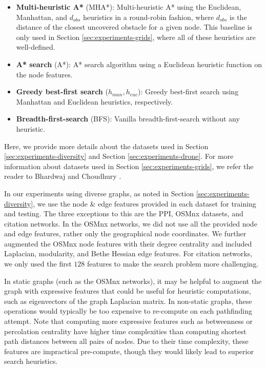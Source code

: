 \begin{itemize}
    \item \textbf{Multi-heuristic A*} (MHA*)\cite{aine2016multi}: Multi-heuristic A* using the Euclidean, Manhattan, and $d_{obs}$ heuristics in a round-robin fashion, where $d_{obs}$ is the distance of the closest uncovered obstacle for a given node.  This baseline is only used in Section \ref{sec:experiments-grids}, where all of these heuristics are well-defined.
    
    \item \textbf{A* search} (A*): A* search algorithm using a Euclidean heuristic function on the node features.
    
    \item \textbf{Greedy best-first search} ($h_{man}, h_{euc}$): Greedy best-first search using Manhattan and Euclidean heuristics, respectively.
    
    \item \textbf{Breadth-first-search} (BFS): Vanilla breadth-first-search without any heuristic.
\end{itemize}


 Here, we provide more details about the datasets used in Section \ref{sec:experiments-diversity} and Section \ref{sec:experiments-drone}. For more information about datasets used in Section \ref{sec:experiments-grids}, we refer the reader to Bhardwaj and Choudhury \etal \cite{bhardwaj2017learning}. 


In our experiments using diverse graphs, as noted in Section \ref{sec:experiments-diversity}, we use the node \& edge features provided in each dataset for training and testing. The three exceptions to this are the PPI, OSMnx datasets, and citation networks. In the OSMnx networks, we did not use all the provided node and edge features, rather only the geographical node coordinates. We further augmented the OSMnx node features with their degree centrality and included Laplacian, modularity, and Bethe Hessian edge features. For citation networks, we only used the first $128$ features to make the search problem more challenging.

In static graphs (such as the OSMnx networks), it may be helpful to augment the graph with expressive features that could be useful for heuristic computations, such as eigenvectors of the graph Laplacian matrix. In non-static graphs, these operations would typically be too expensive to re-compute on each pathfinding attempt. Note that computing more expressive features such as betweenness or percolation centrality have higher time complexities than computing shortest path distances between all pairs of nodes. Due to their time complexity, these features are impractical pre-compute, though they would likely lead to superior search heuristics.



